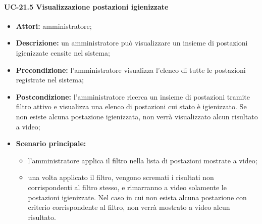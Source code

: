 \paragraph{UC-21.5 Visualizzazione postazioni igienizzate}
\begin{itemize}
    \item \textbf{Attori:} amministratore;
    \item \textbf{Descrizione:} un amministratore pu\`{o} visualizzare un insieme di postazioni igienizzate censite nel sistema;
    \item \textbf{Precondizione:} l'amministratore visualizza l'elenco di tutte le postazioni registrate nel sistema;
    \item \textbf{Postcondizione:} l'amministratore ricerca un insieme di postazioni tramite filtro attivo e visualizza una elenco di postazioni cui stato è igienizzato. Se non esiste alcuna postazione igienizzata, non verrà visualizzato alcun risultato a video;
    \item \textbf{Scenario principale:}
    \begin{itemize}
        \item l'amministratore applica il filtro nella lista di postazioni mostrate a video;
        \item una volta applicato il filtro, vengono scremati i risultati non corrispondenti al filtro stesso, e rimarranno a video solamente le postazioni igienizzate. Nel caso in cui non esista alcuna postazione con criterio corrispondente al filtro, non verrà mostrato a video alcun risultato.
    \end{itemize}
\end{itemize}

